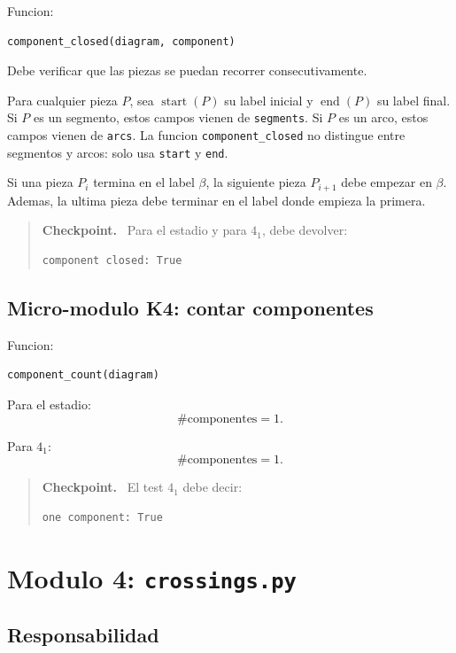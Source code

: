 \documentclass[11pt,letterpaper]{amsart}
\newenvironment{checkpoint}
{\par\medskip\noindent\begin{quote}\textbf{Checkpoint.}\ }
{\end{quote}\par\medskip}
\begin{document}
Funcion:
\begin{verbatim}
component_closed(diagram, component)
\end{verbatim}

Debe verificar que las piezas se puedan recorrer consecutivamente.

Para cualquier pieza \(P\), sea \(\operatorname{start}(P)\) su label inicial y
\(\operatorname{end}(P)\) su label final. Si \(P\) es un segmento, estos campos
vienen de \texttt{segments}. Si \(P\) es un arco, estos campos vienen de
\texttt{arcs}. La funcion \texttt{component\_closed} no distingue entre
segmentos y arcos: solo usa \texttt{start} y \texttt{end}.

Si una pieza \(P_i\) termina en el label \(\beta\), la siguiente pieza
\(P_{i+1}\) debe empezar en \(\beta\). Ademas, la ultima pieza debe terminar en
el label donde empieza la primera.

\begin{checkpoint}
Para el estadio y para \(4_1\), debe devolver:
\begin{verbatim}
component closed: True
\end{verbatim}
\end{checkpoint}

\subsection{Micro-modulo K4: contar componentes}

Funcion:
\begin{verbatim}
component_count(diagram)
\end{verbatim}

Para el estadio:
\[
\#\text{componentes}=1.
\]

Para \(4_1\):
\[
\#\text{componentes}=1.
\]

\begin{checkpoint}
El test \(4_1\) debe decir:
\begin{verbatim}
one component: True
\end{verbatim}
\end{checkpoint}

\section{Modulo 4: \texttt{crossings.py}}

\subsection{Responsabilidad}
\end{document}
